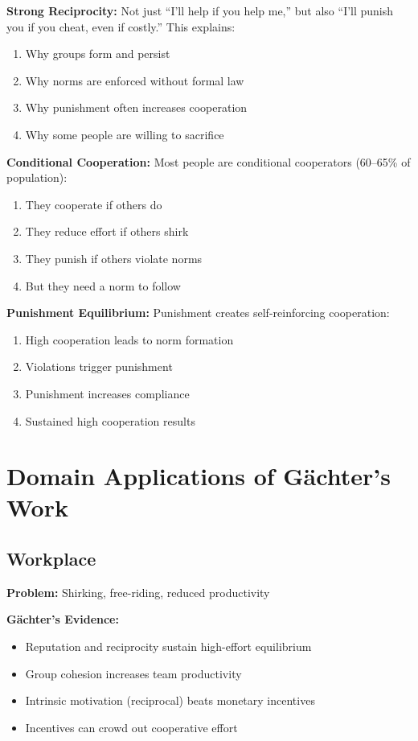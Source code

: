 \documentclass[11pt]{article}
\begin{document}
\textbf{Strong Reciprocity:} Not just ``I'll help if you help me,'' but also
``I'll punish you if you cheat, even if costly.'' This explains:
\begin{enumerate}
    \item Why groups form and persist
    \item Why norms are enforced without formal law
    \item Why punishment often increases cooperation
    \item Why some people are willing to sacrifice
\end{enumerate}

\textbf{Conditional Cooperation:} Most people are conditional cooperators (60–65\%
of population):
\begin{enumerate}
    \item They cooperate if others do
    \item They reduce effort if others shirk
    \item They punish if others violate norms
    \item But they need a norm to follow
\end{enumerate}

\textbf{Punishment Equilibrium:} Punishment creates self-reinforcing cooperation:
\begin{enumerate}
    \item High cooperation leads to norm formation
    \item Violations trigger punishment
    \item Punishment increases compliance
    \item Sustained high cooperation results
\end{enumerate}

\section*{Domain Applications of Gächter's Work}

\subsection*{Workplace}

\textbf{Problem:} Shirking, free-riding, reduced productivity

\textbf{Gächter's Evidence:}
\begin{itemize}
    \item Reputation and reciprocity sustain high-effort equilibrium
    \item Group cohesion increases team productivity
    \item Intrinsic motivation (reciprocal) beats monetary incentives
    \item Incentives can crowd out cooperative effort
\end{itemize}
\end{document}
